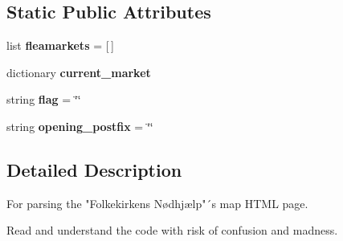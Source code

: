 \subsection*{Static Public Attributes}
\begin{DoxyCompactItemize}
\item 
\hypertarget{classfolkekirke__parser_1_1_my_h_t_m_l_parser_a8ed55b63fd3f11bd0fd4d5466eed8f1b}{list {\bfseries fleamarkets} = \mbox{[}$\,$\mbox{]}}\label{classfolkekirke__parser_1_1_my_h_t_m_l_parser_a8ed55b63fd3f11bd0fd4d5466eed8f1b}

\item 
dictionary {\bfseries current\-\_\-market}
\item 
\hypertarget{classfolkekirke__parser_1_1_my_h_t_m_l_parser_a7e05738fb2aad8aa1cb7b13c49ae8b7f}{string {\bfseries flag} = \char`\"{}\char`\"{}}\label{classfolkekirke__parser_1_1_my_h_t_m_l_parser_a7e05738fb2aad8aa1cb7b13c49ae8b7f}

\item 
\hypertarget{classfolkekirke__parser_1_1_my_h_t_m_l_parser_a220553a4908b62b0eaab896a86b955d5}{string {\bfseries opening\-\_\-postfix} = \char`\"{}\char`\"{}}\label{classfolkekirke__parser_1_1_my_h_t_m_l_parser_a220553a4908b62b0eaab896a86b955d5}

\end{DoxyCompactItemize}


\subsection{Detailed Description}
\begin{DoxyVerb}For parsing the "Folkekirkens Nødhjælp"´s map HTML page.

    Read and understand the code with risk of confusion and madness.
\end{DoxyVerb}
 

